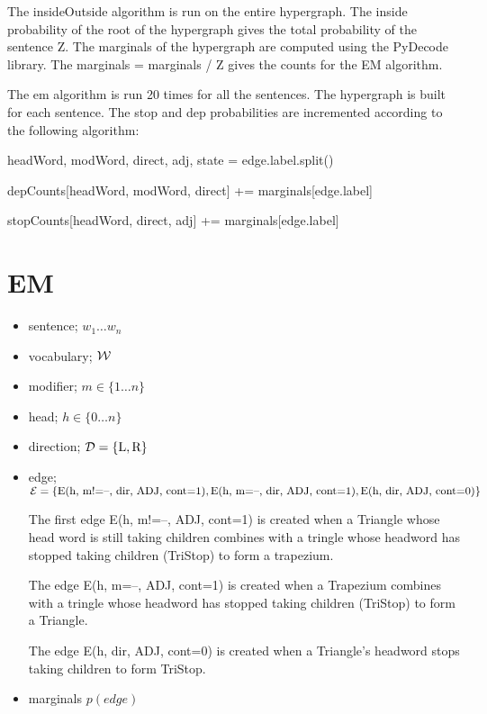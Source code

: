 \documentclass{article}
\begin{document}
 The insideOutside algorithm is run on the entire hypergraph. The inside probability of the root of the hypergraph gives the total probability of the sentence Z. The marginals of the hypergraph are computed using the PyDecode library. The marginals = marginals / Z gives the counts for the EM algorithm.

The em algorithm is run 20 times for all the sentences. The hypergraph is built for each sentence. The stop and dep probabilities are incremented according to the following algorithm:


\begin{algorithm}
\begin{algorithmic}

   \State headWord, modWord, direct, adj, state = edge.label.split()

          \State depCounts[headWord, modWord, direct] += marginals[edge.label]
        \EndIf


          \State stopCounts[headWord, direct, adj] += marginals[edge.label]
        \EndIf

\EndFor

\end{algorithmic}
\end{algorithm}

\section{EM}


\begin{itemize}
\item sentence; $w_1 \ldots w_n$
\item vocabulary; ${\cal W}$
\item modifier; $m \in \{1 \ldots n\}$
\item head; $h \in \{0 \ldots n\}$
\item direction; ${\cal D}= \{\textrm{L}, \textrm{R}\}$
\item edge; ${\cal E}= \{\textrm{E(h, m!=--, dir, ADJ, cont=1)}, \textrm{E(h, m=--, dir, ADJ, cont=1)}, \textrm{E(h, dir, ADJ, cont=0)}\}$

The first edge \textrm{E(h, m!=--, ADJ, cont=1)} is created when a Triangle whose head word is still taking children combines with a tringle whose headword has stopped taking children (TriStop) to form a trapezium.

The edge \textrm{E(h, m=--, ADJ, cont=1)} is created when a Trapezium combines with a tringle whose headword has stopped taking children (TriStop) to form a Triangle.

The edge \textrm{E(h, dir, ADJ, cont=0)} is created when a Triangle's headword stops taking children to form TriStop.


\item marginals $p(edge)$
\end{itemize}
\end{document}
